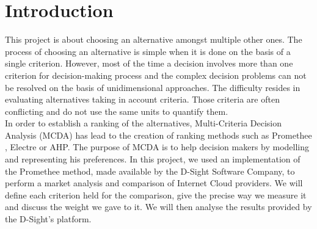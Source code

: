 \documentclass[a4paper,11pt]{article}
\begin{document}
\section{Introduction}
This project is about choosing an alternative amongst multiple other ones. The process of choosing an alternative is simple when it is done on the basis of a single criterion. However, most of the time a decision involves more than one criterion for decision-making process and the complex decision problems can not be resolved on the basis of unidimensional approaches. The difficulty resides in evaluating alternatives taking in account criteria. Those criteria are often conflicting and do not use the same units to quantify them.\\
In order to establish a ranking of the alternatives, Multi-Criteria Decision Analysis (MCDA) has lead to the creation of ranking methods such as Promethee , Electre or AHP. The purpose of MCDA is to help decision makers by modelling and representing his preferences. In this project, we used an implementation of the Promethee method, made available by the D-Sight Software Company, to perform a market analysis and comparison of Internet \og Cloud \fg{} providers. We will define each criterion held for the comparison, give the precise way we measure it and discuss the weight we gave to it. We will then analyse the results provided by the D-Sight's platform.\\ %
\end{document}
